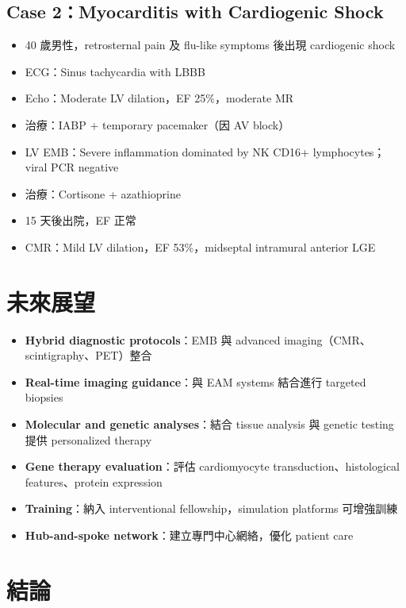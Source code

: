 \documentclass[12pt,a4paper]{article}
\begin{document}
\subsection{Case 2：Myocarditis with Cardiogenic Shock}

\begin{itemize}
    \item 40 歲男性，retrosternal pain 及 flu-like symptoms 後出現 cardiogenic shock
    \item ECG：Sinus tachycardia with LBBB
    \item Echo：Moderate LV dilation，EF 25\%，moderate MR
    \item 治療：IABP + temporary pacemaker（因 AV block）
    \item LV EMB：Severe inflammation dominated by NK CD16+ lymphocytes；viral PCR negative
    \item 治療：Cortisone + azathioprine
    \item 15 天後出院，EF 正常
    \item CMR：Mild LV dilation，EF 53\%，midseptal intramural anterior LGE
\end{itemize}

\section{未來展望}

\begin{itemize}
    \item \textbf{Hybrid diagnostic protocols}：EMB 與 advanced imaging（CMR、scintigraphy、PET）整合
    \item \textbf{Real-time imaging guidance}：與 EAM systems 結合進行 targeted biopsies
    \item \textbf{Molecular and genetic analyses}：結合 tissue analysis 與 genetic testing 提供 personalized therapy
    \item \textbf{Gene therapy evaluation}：評估 cardiomyocyte transduction、histological features、protein expression
    \item \textbf{Training}：納入 interventional fellowship，simulation platforms 可增強訓練
    \item \textbf{Hub-and-spoke network}：建立專門中心網絡，優化 patient care
\end{itemize}

\section{結論}
\end{document}
